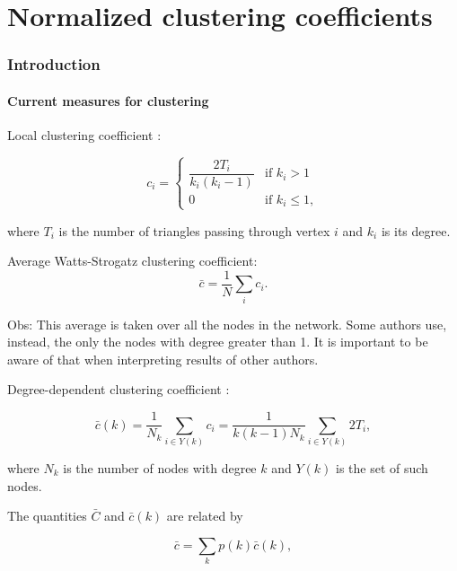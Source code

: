 \documentclass{article}
\begin{document}
\part{Normalized clustering coefficients}


\section{Introduction}

\subsection{Current measures for clustering}

Local clustering coefficient \cite{Watts1998}:

\begin{equation} \label{eq:Cws}
    c_i = 
    \left\{
    	\begin{array}{ll}
    		\dfrac{2 T_i}{k_i (k_i-1)}  & \mbox{if } k_i > 1 \\
    		0 & \mbox{if } k_i \leq 1,
    	\end{array}
    \right.
\end{equation}

where $T_i$ is the number of triangles passing through vertex $i$ and $k_i$ is its degree.

Average Watts-Strogatz clustering coefficient:
\begin{equation}
    \bar{c} = \dfrac{1}{N} \sum_i c_i.
\end{equation}

Obs: This average is taken over all the nodes in the network. Some authors use, instead, the only the nodes with degree greater than 1. It is important to be aware of that when interpreting results of other authors.

Degree-dependent clustering coefficient \cite{Vazquez2002Large-scaleInternet}:

\begin{equation}
    \bar{c}(k) = \dfrac{1}{N_k} \sum_{i\in Y(k)} c_i = \dfrac{1}{k(k-1)N_k} \sum_{i\in Y(k)} 2T_i,
\end{equation}

where $N_k$ is the number of nodes with degree $k$ and $Y(k)$ is the set of such nodes.

The quantities $\bar{C}$ and $\bar{c}(k)$ are related by

\begin{equation}
    \bar{c} = \sum_k p(k) \bar{c}(k),
\end{equation}
\end{document}
